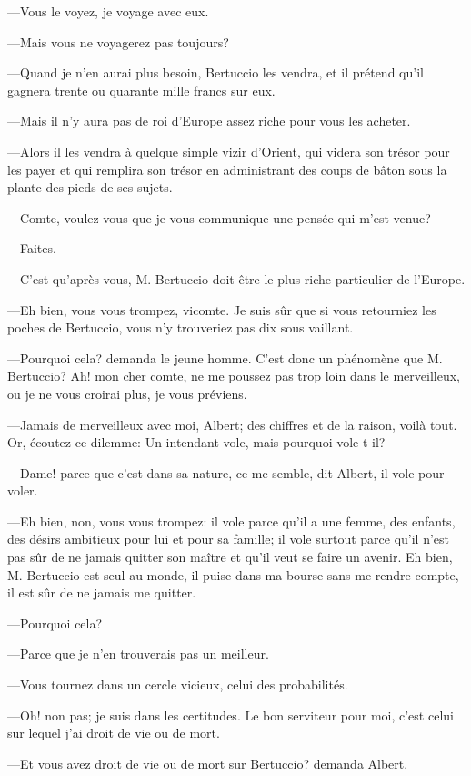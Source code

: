 —Vous le voyez, je voyage avec eux. 

—Mais vous ne voyagerez pas toujours? 

—Quand je n'en aurai plus besoin, Bertuccio les vendra, et il prétend qu'il gagnera trente ou quarante mille francs sur eux. 

—Mais il n'y aura pas de roi d'Europe assez riche pour vous les acheter. 

—Alors il les vendra à quelque simple vizir d'Orient, qui videra son trésor pour les payer et qui remplira son trésor en administrant des coups de bâton sous la plante des pieds de ses sujets. 

—Comte, voulez-vous que je vous communique une pensée qui m'est venue? 

—Faites. 

—C'est qu'après vous, M. Bertuccio doit être le plus riche particulier de l'Europe. 

—Eh bien, vous vous trompez, vicomte. Je suis sûr que si vous retourniez les poches de Bertuccio, vous n'y trouveriez pas dix sous vaillant. 

—Pourquoi cela? demanda le jeune homme. C'est donc un phénomène que M. Bertuccio? Ah! mon cher comte, ne me poussez pas trop loin dans le merveilleux, ou je ne vous croirai plus, je vous préviens. 

—Jamais de merveilleux avec moi, Albert; des chiffres et de la raison, voilà tout. Or, écoutez ce dilemme: Un intendant vole, mais pourquoi vole-t-il? 

—Dame! parce que c'est dans sa nature, ce me semble, dit Albert, il vole pour voler. 

—Eh bien, non, vous vous trompez: il vole parce qu'il a une femme, des enfants, des désirs ambitieux pour lui et pour sa famille; il vole surtout parce qu'il n'est pas sûr de ne jamais quitter son maître et qu'il veut se faire un avenir. Eh bien, M. Bertuccio est seul au monde, il puise dans ma bourse sans me rendre compte, il est sûr de ne jamais me quitter. 

—Pourquoi cela? 

—Parce que je n'en trouverais pas un meilleur. 

—Vous tournez dans un cercle vicieux, celui des probabilités. 

—Oh! non pas; je suis dans les certitudes. Le bon serviteur pour moi, c'est celui sur lequel j'ai droit de vie ou de mort. 

—Et vous avez droit de vie ou de mort sur Bertuccio? demanda Albert. 

